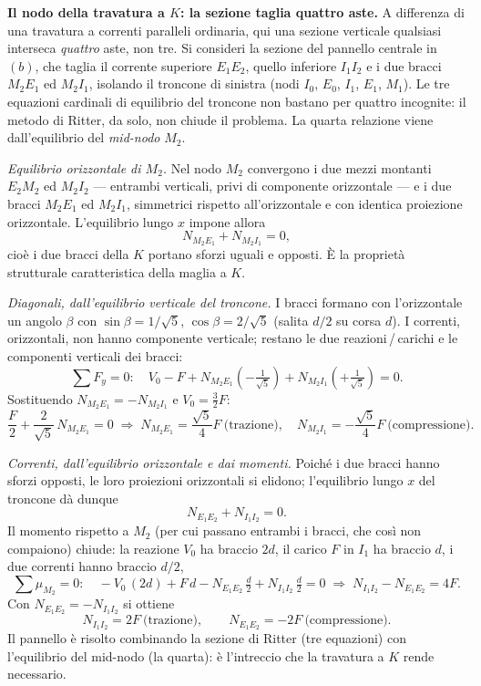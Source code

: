 \begin{esercizio}
\begin{svolgimento}
		\noindent\textbf{Il nodo della travatura a $K$: la
			sezione taglia quattro aste.}
		A differenza di una travatura a correnti paralleli
		ordinaria, qui una sezione verticale qualsiasi
		interseca \emph{quattro} aste, non tre. Si consideri
		la sezione del pannello centrale in
		\,$(b)$, che taglia il
		corrente superiore $E_1E_2$, quello inferiore
		$I_1I_2$ e i due bracci $M_2E_1$ ed $M_2I_1$,
		isolando il troncone di sinistra (nodi $I_0$, $E_0$,
		$I_1$, $E_1$, $M_1$). Le tre equazioni cardinali di
		equilibrio del troncone non bastano per quattro
		incognite: il metodo di Ritter, da solo, non chiude
		il problema. La quarta relazione viene
		dall'equilibrio del \emph{mid-nodo} $M_2$.
		
		\smallskip
		\noindent\textit{Equilibrio orizzontale di $M_2$.}
		Nel nodo $M_2$ convergono i due mezzi montanti
		$E_2M_2$ ed $M_2I_2$ --- entrambi verticali, privi
		di componente orizzontale --- e i due bracci
		$M_2E_1$ ed $M_2I_1$, simmetrici rispetto
		all'orizzontale e con identica proiezione
		orizzontale. L'equilibrio lungo $x$ impone allora
		\[
		N_{M_2E_1} + N_{M_2I_1} = 0,
		\]
		cioè i due bracci della $K$ portano sforzi uguali e
		opposti. È la proprietà strutturale caratteristica
		della maglia a $K$.
		
		\smallskip
		\noindent\textit{Diagonali, dall'equilibrio
			verticale del troncone.} I bracci formano con
		l'orizzontale un angolo $\beta$ con
		$\sin\beta = 1/\sqrt5$, $\cos\beta = 2/\sqrt5$
		(salita $d/2$ su corsa $d$). I correnti, orizzontali,
		non hanno componente verticale; restano le due
		reazioni\,/\,carichi e le componenti verticali dei
		bracci:
		\[
		\sum F_y = 0:\quad
		V_0 - F
		+ N_{M_2E_1}\!\left(-\tfrac{1}{\sqrt5}\right)
		+ N_{M_2I_1}\!\left(+\tfrac{1}{\sqrt5}\right) = 0 .
		\]
		Sostituendo $N_{M_2E_1} = -N_{M_2I_1}$ e
		$V_0 = \tfrac32 F$:
		\[
		\frac{F}{2} + \frac{2}{\sqrt5}\,N_{M_2E_1} = 0
		\;\Rightarrow\;
		N_{M_2E_1} = \frac{\sqrt5}{4}F \ \text{(trazione)},
		\quad
		N_{M_2I_1} = -\frac{\sqrt5}{4}F \ \text{(compressione)}.
		\]
		
		\smallskip
		\noindent\textit{Correnti, dall'equilibrio
			orizzontale e dai momenti.} Poiché i due bracci
		hanno sforzi opposti, le loro proiezioni orizzontali
		si elidono; l'equilibrio lungo $x$ del troncone dà
		dunque
		\[
		N_{E_1E_2} + N_{I_1I_2} = 0 .
		\]
		Il momento rispetto a $M_2$ (per cui passano
		entrambi i bracci, che così non compaiono) chiude:
		la reazione $V_0$ ha braccio $2d$, il carico $F$ in
		$I_1$ ha braccio $d$, i due correnti hanno braccio
		$d/2$,
		\[
		\sum \mu_{M_2} = 0:\quad
		-V_0\,(2d) + F\,d
		- N_{E_1E_2}\,\tfrac{d}{2} + N_{I_1I_2}\,\tfrac{d}{2}
		= 0
		\;\Rightarrow\;
		N_{I_1I_2} - N_{E_1E_2} = 4F .
		\]
		Con $N_{E_1E_2} = -N_{I_1I_2}$ si ottiene
		\[
		N_{I_1I_2} = 2F \ \text{(trazione)},
		\qquad
		N_{E_1E_2} = -2F \ \text{(compressione)}.
		\]
		Il pannello è risolto combinando la sezione di
		Ritter (tre equazioni) con l'equilibrio del mid-nodo
		(la quarta): è l'intreccio che la travatura a $K$
		rende necessario.
		

\end{svolgimento}
\end{esercizio}
